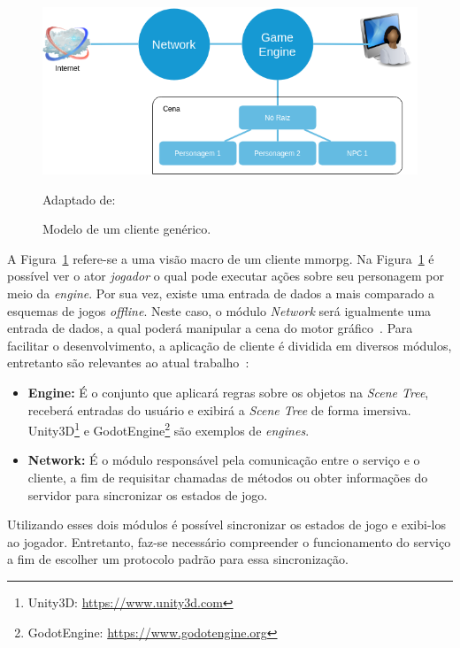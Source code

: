 \begin{figure}[htb!]
\caption{Modelo de um cliente genérico.}
\label{fig:gateway}
\includegraphics[height=5cm]{img/cap2/cliente.png}
\centering

Adaptado de:~\cite{507915, faber}
\end{figure}


A Figura~\ref{fig:gateway} refere-se a uma visão macro de um cliente \ac{mmorpg}.
%
Na Figura~\ref{fig:gateway} é possível ver o ator \textit{jogador} o qual pode executar ações sobre seu personagem por meio da \textit{engine}.
%
Por sua vez, existe uma entrada de dados a mais comparado a esquemas de jogos \textit{offline}.
%
Neste caso, o módulo \textit{Network} será igualmente uma entrada de dados, a qual poderá manipular a cena do motor gráfico~\cite{faber}.
%
Para facilitar o desenvolvimento, a aplicação de cliente é dividida em diversos módulos, entretanto são relevantes ao atual trabalho~\cite{albion_online_unite}:



\begin{itemize}
  \item \textbf{Engine:} É o conjunto que aplicará regras sobre os objetos na \textit{Scene Tree}, receberá entradas do usuário e exibirá a \textit{Scene Tree} de forma imersiva. Unity3D\footnote{Unity3D: \url{https://www.unity3d.com}} e GodotEngine\footnote{GodotEngine: \url{https://www.godotengine.org}} são exemplos de \textit{engines}.
  \item \textbf{Network:} É o módulo responsável pela comunicação entre o serviço e o cliente, a fim de requisitar chamadas de métodos ou obter informações do servidor para sincronizar os estados de jogo.
\end{itemize}



Utilizando esses dois módulos é possível sincronizar os estados de jogo e exibi-los ao jogador.
%
Entretanto, faz-se necessário compreender o funcionamento do serviço a fim de escolher um protocolo padrão para essa sincronização.



